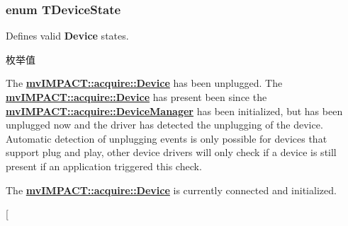 \hypertarget{group___common_interface_ga1207fea3233acb11831696cd74e142e8}{
\subsubsection[{T\+Device\+State}]{\setlength{\rightskip}{0pt plus 5cm}enum {\bf T\+Device\+State}}}\label{group___common_interface_ga1207fea3233acb11831696cd74e142e8}


Defines valid {\bfseries Device} states. 

\begin{Desc}
\item[枚举值]\par
\begin{description}
\item[{\em 
\hypertarget{group___common_interface_gga1207fea3233acb11831696cd74e142e8af26f60ad35f31f49730bcc91121e45da}{ds\+Absent}\label{group___common_interface_gga1207fea3233acb11831696cd74e142e8af26f60ad35f31f49730bcc91121e45da}
}]The {\bfseries \hyperlink{classmv_i_m_p_a_c_t_1_1acquire_1_1_device}{mv\+I\+M\+P\+A\+C\+T\+::acquire\+::\+Device}} has been unplugged. The {\bfseries \hyperlink{classmv_i_m_p_a_c_t_1_1acquire_1_1_device}{mv\+I\+M\+P\+A\+C\+T\+::acquire\+::\+Device}} has present been since the {\bfseries \hyperlink{classmv_i_m_p_a_c_t_1_1acquire_1_1_device_manager}{mv\+I\+M\+P\+A\+C\+T\+::acquire\+::\+Device\+Manager}} has been initialized, but has been unplugged now and the driver has detected the unplugging of the device. Automatic detection of unplugging events is only possible for devices that support plug and play, other device drivers will only check if a device is still present if an application triggered this check. \item[{\em 
\hypertarget{group___common_interface_gga1207fea3233acb11831696cd74e142e8aaea3b2eac280b43a21752bce7199fca6}{ds\+Present}\label{group___common_interface_gga1207fea3233acb11831696cd74e142e8aaea3b2eac280b43a21752bce7199fca6}
}]The {\bfseries \hyperlink{classmv_i_m_p_a_c_t_1_1acquire_1_1_device}{mv\+I\+M\+P\+A\+C\+T\+::acquire\+::\+Device}} is currently connected and initialized. \item[{\em 
}
\end{description}
\end{Desc}
